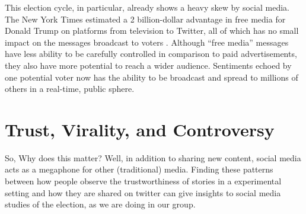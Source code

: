 This election cycle, in particular, already shows a heavy skew by social media. The New York Times estimated a 2 billion-dollar advantage in free media for Donald Trump on platforms from television to Twitter, all of which has no small impact on the messages broadcast to voters \cite{nyt-trump-free-media}. Although ``free media'' messages have less ability to be carefully controlled in comparison to paid advertisements, they also have more potential to reach a wider audience. Sentiments echoed by one potential voter now has the ability to be broadcast and spread to millions of others in a real-time, public sphere.
  


\section{Trust, Virality, and Controversy}

So,
Why does this matter?
Well, in addition to sharing new content, social media acts as a megaphone for other (traditional) media. Finding these patterns between how people observe the trustworthiness of stories in a experimental setting and how they are shared on twitter can give insights to social media studies of the election, as we are doing in our group.


















